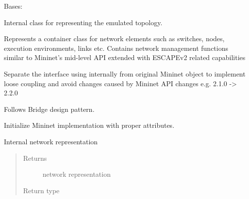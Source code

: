 \documentclass[letterpaper,10pt,english]{sphinxmanual}
\begin{document}

\begin{fulllineitems}
\label{infr/topology:escape.infr.topology.ESCAPENetworkBridge}
Bases: \href{https://docs.python.org/2.7/library/functions.html\#object}{}

Internal class for representing the emulated topology.

Represents a container class for network elements such as switches, nodes,
execution environments, links etc. Contains network management functions
similar to Mininet's mid-level API extended with ESCAPEv2 related capabilities

Separate the interface using internally from original Mininet object to
implement loose coupling and avoid changes caused by Mininet API changes
e.g. 2.1.0 -\textgreater{} 2.2.0

Follows Bridge design pattern.

\begin{fulllineitems}
\label{infr/topology:escape.infr.topology.ESCAPENetworkBridge.__init__}
Initialize Mininet implementation with proper attributes.

\end{fulllineitems}


\begin{fulllineitems}
\label{infr/topology:escape.infr.topology.ESCAPENetworkBridge.network}
Internal network representation
\begin{quote}\begin{description}
\item[{Returns}] \leavevmode
network representation

\item[{Return type}] \leavevmode
{}

\end{description}\end{quote}

\end{fulllineitems}



\end{fulllineitems}
\end{document}
